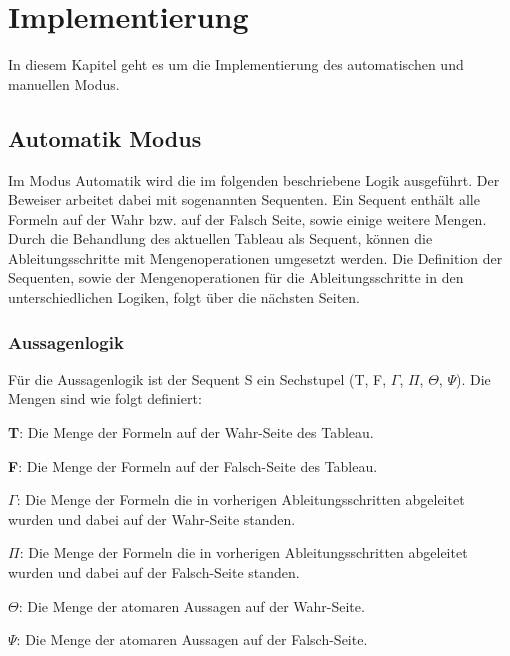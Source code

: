 
\chapter{Implementierung}
In diesem Kapitel geht es um die Implementierung des automatischen und manuellen Modus.

\section{Automatik Modus}
Im Modus Automatik wird die im folgenden beschriebene Logik ausgeführt. Der Beweiser arbeitet dabei mit sogenannten Sequenten. Ein Sequent enthält alle Formeln auf der Wahr bzw. auf der Falsch Seite, sowie einige weitere Mengen. Durch die Behandlung des aktuellen Tableau als Sequent, können die Ableitungsschritte mit Mengenoperationen umgesetzt werden. Die Definition der Sequenten, sowie der Mengenoperationen für die Ableitungsschritte in den unterschiedlichen Logiken, folgt über die nächsten Seiten.

\subsection{Aussagenlogik}
Für die Aussagenlogik ist der Sequent S ein Sechstupel (T, F, $\Gamma$, $\Pi$, $\Theta$, $\Psi$). Die Mengen sind wie folgt definiert:
\begin{description}
\item \textbf{T}: Die Menge der Formeln auf der Wahr-Seite des Tableau.

\item \textbf{F}: Die Menge der Formeln auf der Falsch-Seite des Tableau.

\item \textbf{$\Gamma$}: Die Menge der Formeln die in vorherigen Ableitungsschritten abgeleitet wurden und dabei auf der Wahr-Seite standen.

\item \textbf{$\Pi$}: Die Menge der Formeln die in vorherigen Ableitungsschritten abgeleitet wurden und dabei auf der Falsch-Seite standen.

\item \textbf{$\Theta$}: Die Menge der atomaren Aussagen auf der Wahr-Seite.

\item \textbf{$\Psi$}: Die Menge der atomaren Aussagen auf der Falsch-Seite.
\end{description}

